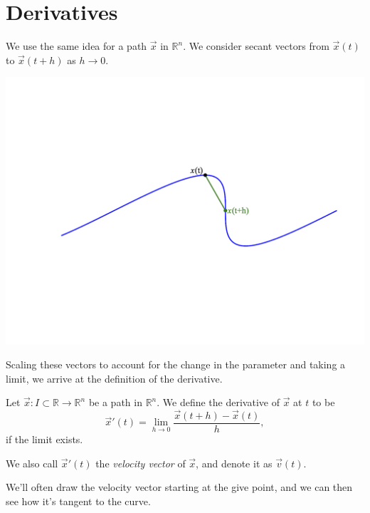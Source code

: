 \documentclass{ximera}
\begin{document}
\section*{Derivatives}

We use the same idea for a path $\vec{x}$ in $\mathbb{R}^n$. We consider secant vectors from $\vec{x}(t)$ to $\vec{x}(t+h)$ as $h\rightarrow 0$.

\begin{image}
\includegraphics[width=\textwidth]{CalcPlot3D-curve_deriv}
\end{image}

Scaling these vectors to account for the change in the parameter and taking a limit, we arrive at the definition of the derivative.

\begin{definition}
Let $\vec{x}:I\subset\mathbb{R}\rightarrow\mathbb{R}^n$ be a path in $\mathbb{R}^n$. We define the derivative of $\vec{x}$ at $t$ to be
\[
\vec{x}'(t) = \lim_{h\rightarrow 0} \frac{\vec{x}(t+h) - \vec{x}(t)}{h},
\]
if the limit exists.

We also call $\vec{x}'(t)$ the \emph{velocity vector} of $\vec{x}$, and denote it as $\vec{v}(t)$.
\end{definition}

We'll often draw the velocity vector starting at the give point, and we can then see how it's tangent to the curve.
\end{document}
